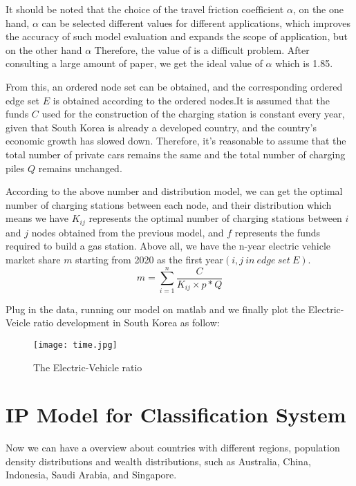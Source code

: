 \documentclass[12pt]{article}  %
\begin{document}
It should be noted that the choice of the travel friction coefficient ${\alpha}$, on the one hand, ${\alpha}$ can be selected different values for different applications, which improves the accuracy of such model evaluation and expands the scope of application, but on the other hand ${\alpha}$ Therefore, the value of is a difficult problem. After consulting a large amount of paper, we get the ideal value of ${\alpha}$ which is 1.85\cite{1}.

From this, an ordered node set can be obtained, and the corresponding ordered edge set ${E}$ is obtained according to the ordered nodes.It is assumed that the funds ${C}$ used for the construction of the charging station is constant every year, given that South Korea is already a developed country, and the country's economic growth has slowed down. Therefore, it's reasonable to assume that the total number of private cars remains the same and the total number of charging piles ${Q}$  remains unchanged. 

According to the above number and distribution model, we can get the optimal number of charging stations between each node, and their distribution which means we have ${K_{ij}}$ represents the optimal number of charging stations between ${i}$ and ${j}$ nodes obtained from the previous model, and ${f}$ represents the funds required to build a gas station. Above all, we have the n-year electric vehicle market share ${m}$ starting from 2020 as the first year${(i,j\ in \ edge\  set\  E)}$.
\begin{equation}
m = \sum\limits_{i = 1}^n {\frac{C}{{ K_{ij} \times p*Q}}} 
\end{equation}

Plug in the data, running our model on matlab and we finally plot the Electric-Veicle ratio development in South Korea as follow: 
\begin{figure}[H]
	\centering
	\texttt{[image: time.jpg]}
	\caption{The Electric-Vehicle ratio}\label{fig:11}
\end{figure}

\section{IP Model for Classification System }
Now we can have a overview about countries with different regions, population density distributions and wealth distributions, such as Australia, China, Indonesia, Saudi Arabia, and Singapore.
\end{document}
